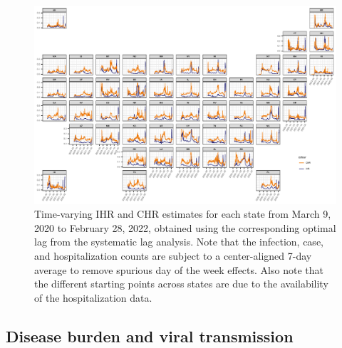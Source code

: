 \documentclass{article}
\begin{document}

\begin{landscape}
\thispagestyle{empty}
\begin{figure}[!tb]
    \centering
   \includegraphics[width=.99\linewidth]{IHR_7dav_Nov5.pdf}
    \caption{Time-varying IHR and CHR estimates for each state from March 9, 2020
    to February 28, 2022, obtained using the corresponding optimal lag from the
    systematic lag analysis. Note that the infection, case, and hospitalization
    counts are subject to a center-aligned 7-day average to remove spurious day
    of the week effects. Also note that the different starting points across
    states are due to the availability of the hospitalization data.}
    \label{fig:IHR_7dav}
\fillandplacepagenumber
\end{figure}
\end{landscape}

\subsection{Disease burden and viral transmission}
\end{document}

